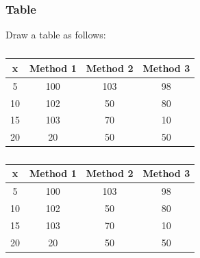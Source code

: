 \documentclass[conference]{sig-alternate}
\begin{document}
\subsubsection{Table}
Draw a table as follows:
\begin{table}[h]
	\begin{subtable}{0.55\textwidth}
		\centering
		\begin{tabular}[h!]{|c|c|c|c|}
			\hline
			x & Method 1 & Method 2 & Method 3 \\
			\hline
			5 & 100 & 103 & 98  \\
			\hline
			10 & 102 & 50 & 80  \\
			\hline
			15 & 103 & 70 & 10  \\
			\hline
			20 & 20 & 50 & 50  \\
			\hline
		\end{tabular}
	\captionsetup{justification=centering}
		\caption{}
		\label{tab:table1_a}
	\end{subtable}%
\hspace{\fill}
\begin{subtable}{0.55\textwidth}
	\centering
	\begin{tabular}[h!]{|c|c|c|c|}
		\hline
		x & Method 1 & Method 2 & Method 3 \\
		\hline
		5 & 100 & 103 & 98  \\
		\hline
		10 & 102 & 50 & 80  \\
		\hline
		15 & 103 & 70 & 10  \\
		\hline
		20 & 20 & 50 & 50  \\
		\hline
	\end{tabular}

	\caption{}
	\label{tab:table1_a}
\end{subtable}%
\caption{}
\end{table}
\end{document}
